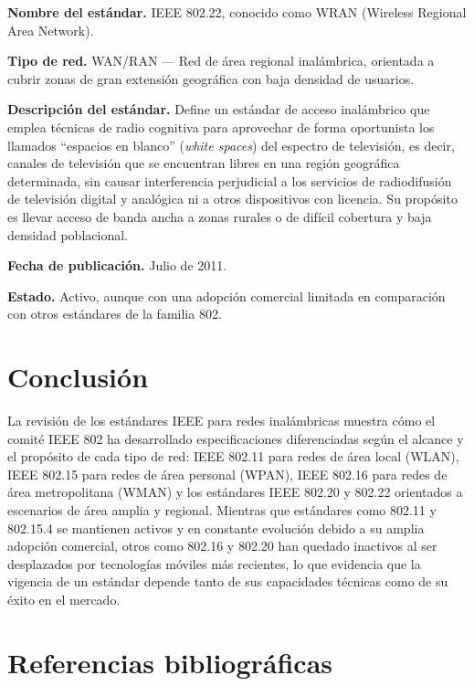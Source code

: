 \documentclass[12pt,letterpaper]{article}
\begin{document}
\textbf{Nombre del estándar.} IEEE 802.22, conocido como WRAN (Wireless Regional Area Network).

\textbf{Tipo de red.} WAN/RAN — Red de área regional inalámbrica, orientada a cubrir zonas de gran extensión geográfica con baja densidad de usuarios.

\textbf{Descripción del estándar.} Define un estándar de acceso inalámbrico que emplea técnicas de radio cognitiva para aprovechar de forma oportunista los llamados ``espacios en blanco'' (\textit{white spaces}) del espectro de televisión, es decir, canales de televisión que se encuentran libres en una región geográfica determinada, sin causar interferencia perjudicial a los servicios de radiodifusión de televisión digital y analógica ni a otros dispositivos con licencia. Su propósito es llevar acceso de banda ancha a zonas rurales o de difícil cobertura y baja densidad poblacional.

\textbf{Fecha de publicación.} Julio de 2011.

\textbf{Estado.} Activo, aunque con una adopción comercial limitada en comparación con otros estándares de la familia 802.

\section{Conclusión}

La revisión de los estándares IEEE para redes inalámbricas muestra cómo el comité IEEE 802 ha desarrollado especificaciones diferenciadas según el alcance y el propósito de cada tipo de red: IEEE 802.11 para redes de área local (WLAN), IEEE 802.15 para redes de área personal (WPAN), IEEE 802.16 para redes de área metropolitana (WMAN) y los estándares IEEE 802.20 y 802.22 orientados a escenarios de área amplia y regional. Mientras que estándares como 802.11 y 802.15.4 se mantienen activos y en constante evolución debido a su amplia adopción comercial, otros como 802.16 y 802.20 han quedado inactivos al ser desplazados por tecnologías móviles más recientes, lo que evidencia que la vigencia de un estándar depende tanto de sus capacidades técnicas como de su éxito en el mercado.

\newpage
\section*{Referencias bibliográficas}
\end{document}
